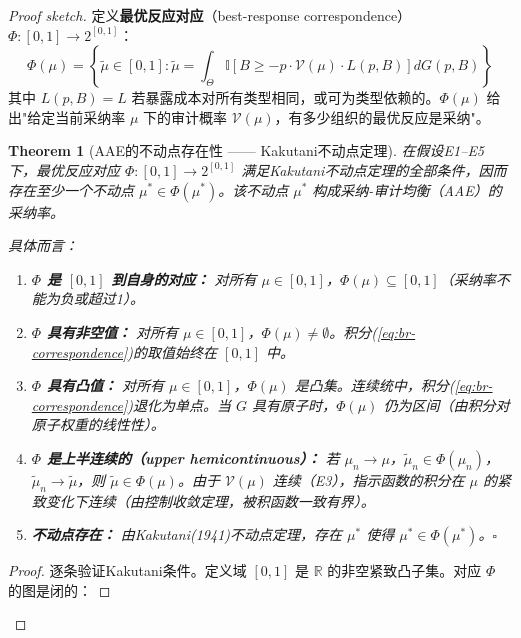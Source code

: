 \documentclass[12pt,a4paper]{ctexart}
\newtheorem{theorem}{Theorem}[section]
\theoremstyle{definition}
\theoremstyle{remark}
\begin{document}
\begin{proof}[Proof sketch]
定义\textbf{最优反应对应}（best-response correspondence）$\Phi: [0,1] \to 2^{[0,1]}$：
\begin{equation}
\Phi(\mu) = \left\{ \tilde{\mu} \in [0,1] : \tilde{\mu} = \int_{\Theta} \mathbb{I}\left[B \geq -p \cdot \mathcal{V}(\mu) \cdot L(p, B)\right] dG(p, B) \right\}
\label{eq:br-correspondence}
\end{equation}
其中 $L(p, B) = L$ 若暴露成本对所有类型相同，或可为类型依赖的。$\Phi(\mu)$ 给出"给定当前采纳率 $\mu$ 下的审计概率 $\mathcal{V}(\mu)$，有多少组织的最优反应是采纳"。

\begin{theorem}[AAE的不动点存在性 —— Kakutani不动点定理]
\label{thm:aae-fixed-point}
在假设E1--E5下，最优反应对应 $\Phi: [0,1] \to 2^{[0,1]}$ 满足Kakutani不动点定理的全部条件，因而存在至少一个不动点 $\mu^* \in \Phi(\mu^*)$。该不动点 $\mu^*$ 构成采纳-审计均衡（AAE）的采纳率。

具体而言：
\begin{enumerate}[label=(\roman*), itemsep=6pt]
\item \textbf{$\Phi$ 是 $[0,1]$ 到自身的对应：} 对所有 $\mu \in [0,1]$，$\Phi(\mu) \subseteq [0,1]$（采纳率不能为负或超过1）。

\item \textbf{$\Phi$ 具有非空值：} 对所有 $\mu \in [0,1]$，$\Phi(\mu) \neq \emptyset$。\hfill\textit{积分(\ref{eq:br-correspondence})的取值始终在 $[0,1]$ 中。}

\item \textbf{$\Phi$ 具有凸值：} 对所有 $\mu \in [0,1]$，$\Phi(\mu)$ 是凸集。\hfill\textit{连续统中，积分(\ref{eq:br-correspondence})退化为单点。当 $G$ 具有原子时，$\Phi(\mu)$ 仍为区间（由积分对原子权重的线性性）。}

\item \textbf{$\Phi$ 是上半连续的（upper hemicontinuous）：} 若 $\mu_n \to \mu$，$\tilde{\mu}_n \in \Phi(\mu_n)$，$\tilde{\mu}_n \to \tilde{\mu}$，则 $\tilde{\mu} \in \Phi(\mu)$。\hfill\textit{由于 $\mathcal{V}(\mu)$ 连续（E3），指示函数的积分在 $\mu$ 的紧致变化下连续（由控制收敛定理，被积函数一致有界）。}

\item \textbf{不动点存在：} 由Kakutani(1941)不动点定理，存在 $\mu^*$ 使得 $\mu^* \in \Phi(\mu^*)$。\hfill$\square$
\end{enumerate}
\end{theorem}

\begin{proof}
逐条验证Kakutani条件。定义域 $[0,1]$ 是 $\mathbb{R}$ 的非空紧致凸子集。对应 $\Phi$ 的图是闭的：


\end{proof}
\end{proof}
\end{document}

